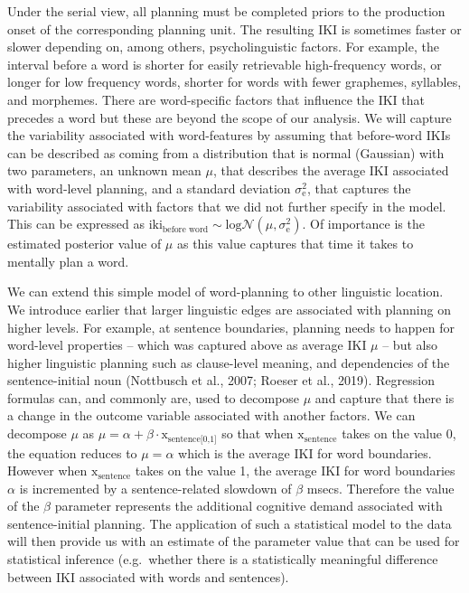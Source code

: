 \documentclass[
  man,floatsintext]{apa7}
\begin{document}
Under the serial view, all planning must be completed priors to the production onset of the corresponding planning unit. The resulting IKI is sometimes faster or slower depending on, among others, psycholinguistic factors. For example, the interval before a word is shorter for easily retrievable high-frequency words, or longer for low frequency words, shorter for words with fewer graphemes, syllables, and morphemes. There are word-specific factors that influence the IKI that precedes a word but these are beyond the scope of our analysis. We will capture the variability associated with word-features by assuming that before-word IKIs can be described as coming from a distribution that is normal (Gaussian) with two parameters, an unknown mean \(\mu\), that describes the average IKI associated with word-level planning, and a standard deviation \(\sigma_\text{e}^2\), that captures the variability associated with factors that we did not further specify in the model. This can be expressed as \(\text{iki}_\text{before word} \sim \text{log}\mathcal{N}(\mu, \sigma_\text{e}^2)\). Of importance is the estimated posterior value of \(\mu\) as this value captures that time it takes to mentally plan a word.

We can extend this simple model of word-planning to other linguistic location. We introduce earlier that larger linguistic edges are associated with planning on higher levels. For example, at sentence boundaries, planning needs to happen for word-level properties -- which was captured above as average IKI \(\mu\) -- but also higher linguistic planning such as clause-level meaning, and dependencies of the sentence-initial noun (Nottbusch et al., 2007; Roeser et al., 2019). Regression formulas can, and commonly are, used to decompose \(\mu\) and capture that there is a change in the outcome variable associated with another factors. We can decompose \(\mu\) as \(\mu = \alpha + \beta \cdot \text{x}_\text{sentence[0,1]}\) so that when \(\text{x}_\text{sentence}\) takes on the value 0, the equation reduces to \(\mu = \alpha\) which is the average IKI for word boundaries. However when \(\text{x}_\text{sentence}\) takes on the value 1, the average IKI for word boundaries \(\alpha\) is incremented by a sentence-related slowdown of \(\beta\) msecs. Therefore the value of the \(\beta\) parameter represents the additional cognitive demand associated with sentence-initial planning. The application of such a statistical model to the data will then provide us with an estimate of the parameter value that can be used for statistical inference (e.g.~whether there is a statistically meaningful difference between IKI associated with words and sentences).
\end{document}
